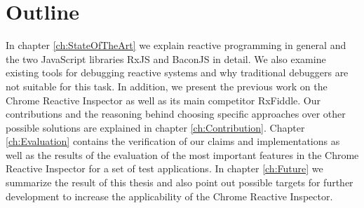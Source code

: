 \section{Outline}
In chapter \ref{ch:StateOfTheArt} we explain reactive programming in general and the two JavaScript libraries RxJS and BaconJS in detail. We also examine existing tools for debugging reactive systems and why traditional debuggers are not suitable for this task. In addition, we present the previous work on the Chrome Reactive Inspector as well as its main competitor RxFiddle.
Our contributions and the reasoning behind choosing specific approaches over other possible solutions are explained in chapter \ref{ch:Contribution}.
Chapter \ref{ch:Evaluation} contains the verification of our claims and implementations as well as the results of the evaluation of the most important features in the Chrome Reactive Inspector for a set of test applications.
In chapter \ref{ch:Future} we summarize the result of this thesis and also point out possible targets for further development to increase the applicability of the Chrome Reactive Inspector.
